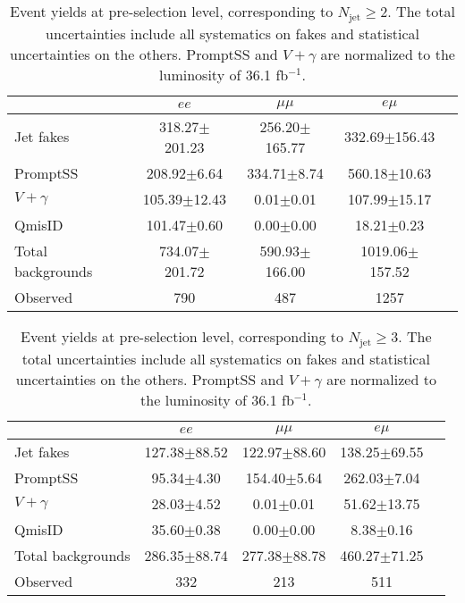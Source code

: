 \begin{table}[h]
\begin{center}
\begin{tabular}{l|cccc}
\hline
\hline
                 &$ee$                   &$\mu\mu$            &$e\mu$           \\
\hline
Jet fakes        &318.27$\pm$201.23       &256.20$\pm$165.77       &332.69$\pm$156.43 \\
 PromptSS        &208.92$\pm$6.64       &334.71$\pm$8.74       &560.18$\pm$10.63 \\
$V+\gamma$        &105.39$\pm$12.43       &0.01$\pm$0.01       &107.99$\pm$15.17\\
   QmisID        &101.47$\pm$0.60       &0.00$\pm$0.00       &18.21$\pm$0.23\\
\hline
Total backgrounds       &734.07$\pm$201.72       &590.93$\pm$166.00       &1019.06$\pm$157.52 \\
Observed        &790       &487       &1257 \\
\hline
\hline
\end{tabular}
\caption{Event yields at pre-selection level, corresponding to $N_{\text{jet}}\geq2$. The total uncertainties include all systematics on fakes and statistical uncertainties on the others. PromptSS and $V+\gamma$ are normalized to the luminosity of 36.1 fb$^{-1}$.}
\label{tab:event_yield_low_Njet_CR}
\end{center}
\end{table}

\begin{table}[h]
\begin{center}
\begin{tabular}{l|cccc}
\hline
\hline
                 &$ee$              &$\mu\mu$            &$e\mu$       \\
\hline
Jet fakes        &127.38$\pm$88.52       &122.97$\pm$88.60       &138.25$\pm$69.55 \\
 PromptSS        &95.34$\pm$4.30       &154.40$\pm$5.64       &262.03$\pm$7.04\\
$V+\gamma$        &28.03$\pm$4.52       &0.01$\pm$0.01       &51.62$\pm$13.75\\
   QmisID        &35.60$\pm$0.38       &0.00$\pm$0.00       &8.38$\pm$0.16\\
\hline
Total backgrounds       &286.35$\pm$88.74       &277.38$\pm$88.78       &460.27$\pm$71.25 \\
Observed        &332       &213       &511 \\
\hline
\hline
\end{tabular}
\caption{Event yields at pre-selection level, corresponding to $N_{\text{jet}}\geq3$. The total uncertainties include all systematics on fakes and statistical uncertainties on the others. PromptSS and $V+\gamma$ are normalized to the luminosity of 36.1 fb$^{-1}$.}
\label{tab:event_yield_high_Njet_CR}
\end{center}
\end{table}
